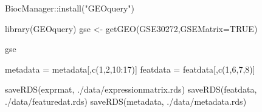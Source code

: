 \documentclass[
]{book}
\newenvironment{Shaded}{\begin{snugshade}}{\end{snugshade}}
\newcommand{\AttributeTok}[1]{\textcolor[rgb]{0.77,0.63,0.00}{#1}}
\newcommand{\ConstantTok}[1]{\textcolor[rgb]{0.00,0.00,0.00}{#1}}
\newcommand{\DecValTok}[1]{\textcolor[rgb]{0.00,0.00,0.81}{#1}}
\newcommand{\FunctionTok}[1]{\textcolor[rgb]{0.00,0.00,0.00}{#1}}
\newcommand{\NormalTok}[1]{#1}
\newcommand{\OtherTok}[1]{\textcolor[rgb]{0.56,0.35,0.01}{#1}}
\newcommand{\SpecialCharTok}[1]{\textcolor[rgb]{0.00,0.00,0.00}{#1}}
\newcommand{\StringTok}[1]{\textcolor[rgb]{0.31,0.60,0.02}{#1}}
\begin{document}
\begin{Shaded}
\begin{Highlighting}[]
\NormalTok{BiocManager}\SpecialCharTok{::}\FunctionTok{install}\NormalTok{(}\StringTok{"GEOquery"}\NormalTok{)}
\end{Highlighting}
\end{Shaded}

\begin{Shaded}
\begin{Highlighting}[]
\FunctionTok{library}\NormalTok{(GEOquery)}
\NormalTok{gse }\OtherTok{\textless{}{-}} \FunctionTok{getGEO}\NormalTok{(}\StringTok{\textquotesingle{}GSE30272\textquotesingle{}}\NormalTok{,}\AttributeTok{GSEMatrix=}\ConstantTok{TRUE}\NormalTok{)}
\end{Highlighting}
\end{Shaded}

\begin{Shaded}
\begin{Highlighting}[]
\NormalTok{gse}
\end{Highlighting}
\end{Shaded}

\begin{Shaded}
\end{Shaded}

\begin{Shaded}
\begin{Highlighting}[]
\NormalTok{metadata }\OtherTok{=}\NormalTok{ metadata[,}\FunctionTok{c}\NormalTok{(}\DecValTok{1}\NormalTok{,}\DecValTok{2}\NormalTok{,}\DecValTok{10}\SpecialCharTok{:}\DecValTok{17}\NormalTok{)]}
\NormalTok{featdata }\OtherTok{=}\NormalTok{ featdata[,}\FunctionTok{c}\NormalTok{(}\DecValTok{1}\NormalTok{,}\DecValTok{6}\NormalTok{,}\DecValTok{7}\NormalTok{,}\DecValTok{8}\NormalTok{)]}
\end{Highlighting}
\end{Shaded}

\begin{Shaded}
\begin{Highlighting}[]
\FunctionTok{saveRDS}\NormalTok{(exprmat, }\StringTok{\textquotesingle{}./data/expressionmatrix.rds\textquotesingle{}}\NormalTok{)}
\FunctionTok{saveRDS}\NormalTok{(featdata, }\StringTok{\textquotesingle{}./data/featuredat.rds\textquotesingle{}}\NormalTok{)}
\FunctionTok{saveRDS}\NormalTok{(metadata, }\StringTok{\textquotesingle{}./data/metadata.rds\textquotesingle{}}\NormalTok{)}
\end{Highlighting}
\end{Shaded}
\end{document}
